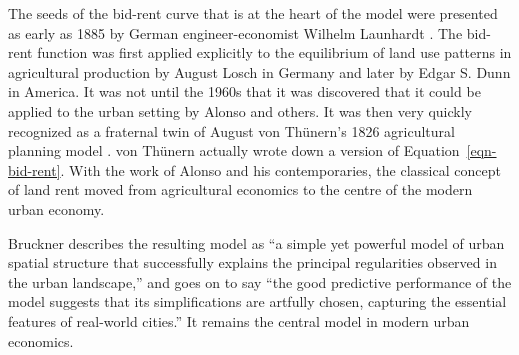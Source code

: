 The seeds of the \gls{bid-rent curve} that is  at the heart of the model were presented as early as 1885  by German engineer-economist Wilhelm Launhardt \cite{blaugEconomicTheoryRetrospect1985, launhardtMathematischeBegruendungVolkswirthschaftslehre1885}. The  \gls{bid-rent function} was first applied explicitly to the equilibrium of land use patterns in agricultural production by August Losch \cite{loschEconomicsLocation1954} in Germany and later by Edgar S. Dunn \cite{dunnEquilibriumLandUsePatterns1954} in America. It was not until the 1960s that it was discovered that it could be applied  to the urban setting by Alonso and others. It was then very quickly recognized as a fraternal twin of August von Th\"unern's 1826 agricultural planning model \cite{vonthunenIsolirteStaatBeziehung1826}. von Th\"unern actually wrote down a version of Equation~\ref{eqn-bid-rent}. With the work of Alonso and his contemporaries, the classical concept of land rent  moved  from  agricultural economics to the centre of the modern urban economy.  






 Bruckner \cite{bruecknerStructureUrbanEquilibria1987} describes the resulting model as ``a simple yet powerful model of urban spatial structure that successfully explains the principal regularities observed in the urban landscape,'' and goes on to say ``the good predictive performance of the model suggests that its simplifications are artfully chosen, capturing the essential features of real-world cities.'' It remains the central model in modern urban economics.

